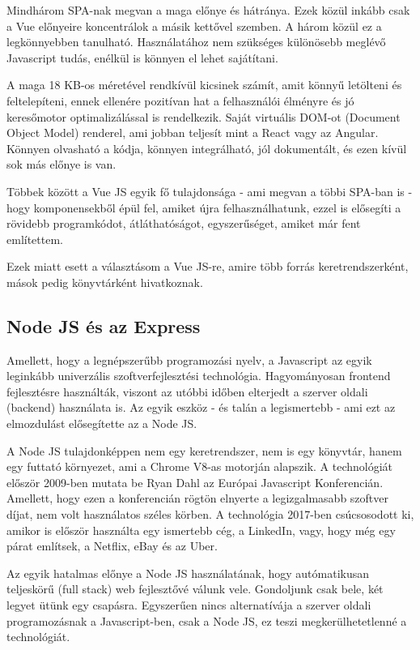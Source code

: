 Mindhárom SPA-nak megvan a maga előnye és hátránya. Ezek közül inkább csak a Vue előnyeire koncentrálok a másik kettővel szemben. A három közül ez a legkönnyebben tanulható. Használatához nem szükséges különösebb meglévő Javascript tudás, enélkül is könnyen el lehet sajátítani.

A maga 18 KB-os méretével rendkívül kicsinek számít, amit könnyű letölteni és feltelepíteni, ennek ellenére pozitívan hat a felhasználói élményre és jó keresőmotor optimalizálással is rendelkezik. Saját virtuális DOM-ot (Document Object Model) renderel, ami jobban teljesít mint a React vagy az Angular. Könnyen olvasható a kódja, könnyen integrálható, jól dokumentált, és ezen kívül sok más előnye is van.

Többek között a Vue JS egyik fő tulajdonsága - ami megvan a többi SPA-ban is - hogy komponensekből épül fel, amiket újra felhasználhatunk, ezzel is elősegíti a rövidebb programkódot, átláthatóságot, egyszerűséget, amiket már fent említettem.

Ezek miatt esett a választásom a Vue JS-re, amire több forrás keretrendszerként, mások pedig könyvtárként hivatkoznak.

\subsection{Node JS és az Express}

Amellett, hogy a legnépszerűbb programozási nyelv, a Javascript az egyik leginkább univerzális szoftverfejlesztési technológia. Hagyományosan frontend fejlesztésre használták, viszont az utóbbi időben elterjedt a szerver oldali (backend) használata is. Az egyik eszköz - és talán a legismertebb - ami ezt az elmozdulást elősegítette az a Node JS.

A Node JS tulajdonképpen nem egy keretrendszer, nem is egy könyvtár, hanem egy futtató környezet, ami a Chrome V8-as motorján alapszik. A technológiát először 2009-ben mutata be Ryan Dahl az Európai Javascript Konferencián. Amellett, hogy ezen a konferencián rögtön elnyerte a legizgalmasabb szoftver díjat, nem volt használatos széles körben. A technológia 2017-ben csúcsosodott ki, amikor is először használta egy ismertebb cég, a LinkedIn, vagy, hogy még egy párat említsek, a Netflix, eBay és az Uber.

Az egyik hatalmas előnye a Node JS használatának, hogy autómatikusan teljeskörű (full stack) web fejlesztővé válunk vele. Gondoljunk csak bele, két legyet ütünk egy csapásra. Egyszerűen nincs alternatívája a szerver oldali programozásnak a Javascript-ben, csak a Node JS, ez teszi megkerülhetetlenné a technológiát.

